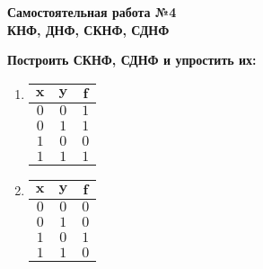 



    \begin{center}
        \textbf{Самостоятельная работа №4\\КНФ, ДНФ, СКНФ, СДНФ}
    \end{center}

    \begin{center}
        \textbf{Построить СКНФ, СДНФ и упростить их:}
    \end{center}

    \begin{enumerate}
        \item \begin{tabular}{|c|c|c|}
                  \hline
                  $\textbf{x}$ & $\textbf{y}$ & $\textbf{f}$ \\
                  \hline
                  \hline
                  $0$ & $0$ & $1$ \\
                  \hline
                  $0$ & $1$ & $1$ \\
                  \hline
                  $1$ & $0$ & $0$ \\
                  \hline
                  $1$ & $1$ & $1$ \\
                  \hline
        \end{tabular}

        \item \begin{tabular}{|c|c|c|}
                  \hline
                  $\textbf{x}$ & $\textbf{y}$ & $\textbf{f}$ \\
                  \hline
                  \hline
                  $0$ & $0$ & $0$ \\
                  \hline
                  $0$ & $1$ & $0$ \\
                  \hline
                  $1$ & $0$ & $1$ \\
                  \hline
                  $1$ & $1$ & $0$ \\
                  \hline
        \end{tabular}


\end{enumerate}

